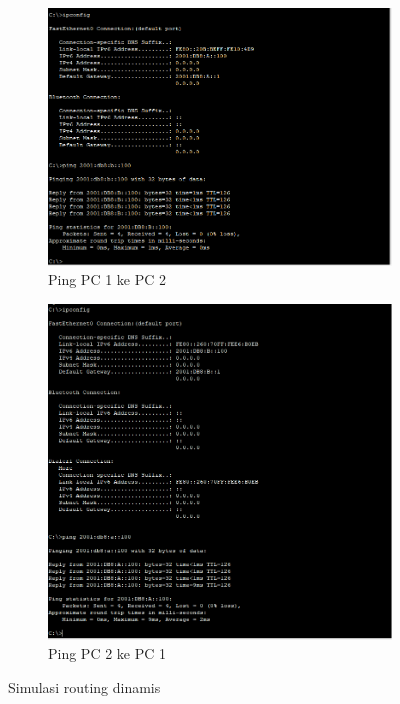 \begin{figure}[H]
		\hspace{1cm}
		\begin{subfigure}[b]{0.55\linewidth}
			\centering
			\includegraphics[width=\linewidth]{P2/img/tumod (4).png}
			\caption{Ping PC 1 ke PC 2\label{fig:pingPC1}}
		\end{subfigure}
		\begin{subfigure}[b]{0.5\linewidth}
			\centering
			\includegraphics[width=\linewidth]{P2/img/tumod (5).png}
			\caption{Ping PC 2 ke PC 1\label{fig:pingPC2}}
		\end{subfigure}
		\hspace{1cm}
		\caption{Simulasi routing dinamis}
\end{figure}


